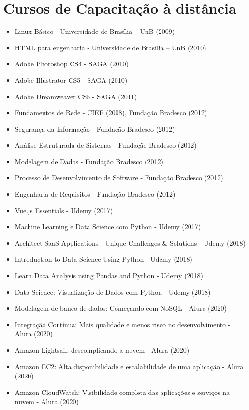 \section{Cursos de Capacitação à distância}
\begin{itemize}
    \item Linux Básico - Universidade de Brasília – UnB (2009)
    \item HTML para engenharia - Universidade de Brasília – UnB (2010)
    \item Adobe Photoshop CS4 - SAGA (2010)
    \item Adobe Illustrator CS5 - SAGA (2010)
    \item Adobe Dreamweaver CS5 - SAGA (2011)
    \item Fundamentos de Rede - CIEE (2008), Fundação Bradesco (2012)
    \item Segurança da Informação - Fundação Bradesco (2012)
    \item Análise Estruturada de Sistemas - Fundação Bradesco (2012)
    \item Modelagem de Dados - Fundação Bradesco (2012)
    \item Processo de Desenvolvimento de Software - Fundação Bradesco (2012)
    \item Engenharia de Requisitos - Fundação Bradesco (2012)
    \item Vue.js Essentials - Udemy (2017)
    \item Machine Learning e Data Science com Python - Udemy (2017)
    \item Architect SaaS Applications - Unique Challenges & Solutions - Udemy (2018)
    \item Introduction to Data Science Using Python - Udemy (2018)
    \item Learn Data Analysis using Pandas and Python - Udemy (2018)
    \item Data Science: Visualização de Dados com Python - Udemy (2018)
    \item Modelagem de banco de dados: Começando com NoSQL - Alura (2020)
    \item Integração Contínua: Mais qualidade e menos risco no desenvolvimento - Alura (2020)
    \item Amazon Lightsail: descomplicando a nuvem - Alura (2020)
    \item Amazon EC2: Alta disponibilidade e escalabilidade de uma aplicação - Alura (2020)
    \item Amazon CloudWatch: Visibilidade completa das aplicações e serviços na nuvem - Alura (2020)

\end{itemize}
